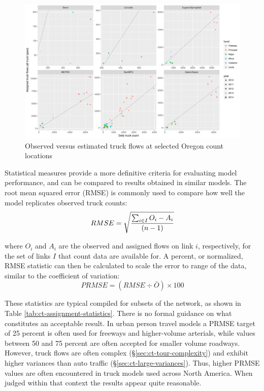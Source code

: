 \begin{figure}
\centering
\includegraphics[width=9in]{ct/ct-validation-redux1.pdf}
\caption{Observed versus estimated truck flows at selected Oregon count locations}
\label{fig:ct-link-scattergram}
\end{figure}

Statistical measures provide a more definitive criteria for evaluating model performance, and can be compared to results obtained in similar models. The root mean squared error (RMSE) is commonly used to compare how well the model replicates observed truck counts:
\begin{equation}
RMSE = \sqrt {\sum_{i \in I} O_i - A_i \over (n - 1)}
\end{equation}

\noindent where $O_i$ and $A_i$ are the observed and assigned flows on link $i$, respectively, for the set of links $I$ that count data are available for. A percent, or normalized, RMSE statistic can then be calculated to scale the error to range of the data, similar to the coefficient of variation:
\begin{equation}
PRMSE = (RMSE \div \bar O) \times 100
\end{equation}

\noindent These statistics are typical compiled for subsets of the network, as shown in Table \ref{tab:ct-assignment-statistics}. There is no formal guidance on what constitutes an acceptable result. In urban person travel models a PRMSE target of 25 percent is often used for freeways and higher-volume arterials, while values between 50 and 75 percent are often accepted for smaller volume roadways. However, truck flows are often complex (\S\ref{sec:ct-tour-complexity}) and exhibit higher variances than auto traffic (\S\ref{sec:ct-large-variances}). Thus, higher PRMSE values are often encountered in truck models used across North America. When judged within that context the results appear quite reasonable.

